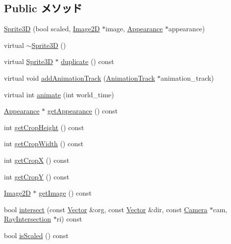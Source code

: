\subsection*{Public メソッド}
\begin{CompactItemize}
\item 
\hyperlink{classm3g_1_1Sprite3D_9cb33fd453d441ed8e99b95f5e29df0c}{Sprite3D} (bool scaled, \hyperlink{classm3g_1_1Image2D}{Image2D} $\ast$image, \hyperlink{classm3g_1_1Appearance}{Appearance} $\ast$appearance)
\item 
virtual \hyperlink{classm3g_1_1Sprite3D_a57bd1e3141ba11c88ddec1e46c188d6}{$\sim$Sprite3D} ()
\item 
virtual \hyperlink{classm3g_1_1Sprite3D}{Sprite3D} $\ast$ \hyperlink{classm3g_1_1Sprite3D_0af34e87be803eb476f9e118d2363246}{duplicate} () const 
\item 
virtual void \hyperlink{classm3g_1_1Sprite3D_415c0b110f95410ded9b85e5d99a496b}{addAnimationTrack} (\hyperlink{classm3g_1_1AnimationTrack}{AnimationTrack} $\ast$animation\_\-track)
\item 
virtual int \hyperlink{classm3g_1_1Sprite3D_8aad1ceab4c2a03609c8a42324ce484d}{animate} (int world\_\-time)
\item 
\hyperlink{classm3g_1_1Appearance}{Appearance} $\ast$ \hyperlink{classm3g_1_1Sprite3D_0219cb20ddea978a5796b5b414d012d2}{getAppearance} () const 
\item 
int \hyperlink{classm3g_1_1Sprite3D_d6d9d6f23b7bb004c93642bcd081f4a3}{getCropHeight} () const 
\item 
int \hyperlink{classm3g_1_1Sprite3D_5c6515f6706675ef31ca5dfa0a03b953}{getCropWidth} () const 
\item 
int \hyperlink{classm3g_1_1Sprite3D_d0ba0211183decc8f0459ca598b12912}{getCropX} () const 
\item 
int \hyperlink{classm3g_1_1Sprite3D_9ef03b219415a1f08aef6745ad5d87d0}{getCropY} () const 
\item 
\hyperlink{classm3g_1_1Image2D}{Image2D} $\ast$ \hyperlink{classm3g_1_1Sprite3D_a8c0193b0e7d47d4b5c9f60df24c44f5}{getImage} () const 
\item 
bool \hyperlink{classm3g_1_1Sprite3D_b6ca418b9c39fed3206e02aed801ee3b}{intersect} (const \hyperlink{classm3g_1_1Vector}{Vector} \&org, const \hyperlink{classm3g_1_1Vector}{Vector} \&dir, const \hyperlink{classm3g_1_1Camera}{Camera} $\ast$cam, \hyperlink{classm3g_1_1RayIntersection}{RayIntersection} $\ast$ri) const 
\item 
bool \hyperlink{classm3g_1_1Sprite3D_8e3e7fa70e1d3f2342580991105779f5}{isScaled} () const 

\end{CompactItemize}
